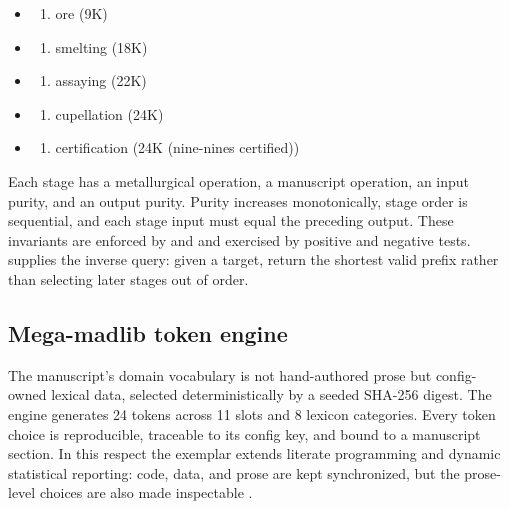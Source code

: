 \documentclass[
  english,
]{article}
\providecommand{\tightlist}{%
  \setlength{\itemsep}{0pt}\setlength{\parskip}{0pt}}
\begin{document}
\begin{itemize}
\tightlist
\item
  \begin{enumerate}
  \def\labelenumi{\arabic{enumi}.}
  \tightlist
  \item
    ore (9K)
  \end{enumerate}
\item
  \begin{enumerate}
  \def\labelenumi{\arabic{enumi}.}
  \setcounter{enumi}{1}
  \tightlist
  \item
    smelting (18K)
  \end{enumerate}
\item
  \begin{enumerate}
  \def\labelenumi{\arabic{enumi}.}
  \setcounter{enumi}{2}
  \tightlist
  \item
    assaying (22K)
  \end{enumerate}
\item
  \begin{enumerate}
  \def\labelenumi{\arabic{enumi}.}
  \setcounter{enumi}{3}
  \tightlist
  \item
    cupellation (24K)
  \end{enumerate}
\item
  \begin{enumerate}
  \def\labelenumi{\arabic{enumi}.}
  \setcounter{enumi}{4}
  \tightlist
  \item
    certification (24K (nine-nines certified))
  \end{enumerate}
\end{itemize}

Each stage has a metallurgical operation, a manuscript operation, an
input purity, and an output purity. Purity increases monotonically,
stage order is sequential, and each stage input must equal the preceding
output. These invariants are enforced by
 and
 and exercised by
positive and negative tests.  supplies the
inverse query: given a target, return the shortest valid prefix rather
than selecting later stages out of order.

\subsection{Mega-madlib token engine}\label{mega-madlib-token-engine}

The manuscript's domain vocabulary is not hand-authored prose but
config-owned lexical data, selected deterministically by a seeded
SHA-256 digest. The engine generates 24 tokens across 11 slots and 8
lexicon categories. Every token choice is reproducible, traceable to its
config key, and bound to a manuscript section. In this respect the
exemplar extends literate programming and dynamic statistical reporting:
code, data, and prose are kept synchronized, but the prose-level choices
are also made inspectable
\citep{knuth1984literate, leisch2002sweave, marwick2018packaging}.
\end{document}
